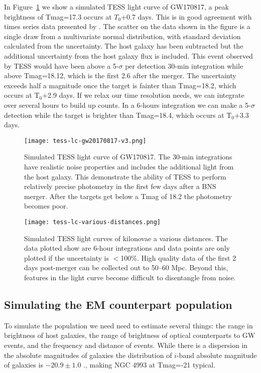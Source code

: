 \documentclass[modern]{aastex61}
\begin{document}
In Figure~\ref{fig:tesslc} we show a simulated TESS light curve of GW170817, a peak brightness of Tmag=17.3 occurs at $T_0$+0.7 days. This is in good agreement with times series data presented by \cite{Arcavi2017}. The scatter on the data shown in the figure is a single draw from a multivariate normal distribution, with standard deviation calculated from the uncertainty. The host galaxy has been subtracted but the additional uncertainty from the host galaxy flux is included. This event observed by TESS would have been above a 5-$\sigma$ per detection 30-min integration while above Tmag=18.12, which is the first 2.6 after the merger. The uncertainty exceeds half a magnitude once the target is fainter than Tmag=18.2, which occurs at T$_0$+2.9 days. If we relax our time resolution needs, we can integrate over several hours to build up counts. In a 6-hours integration we can make a 5-$\sigma$ detection while the target is brighter than Tmag=18.4, which occurs at T$_0$+3.3 days.

\begin{figure}
\centering
\texttt{[image: tess-lc-gw20170817-v3.png]}
\caption{Simulated TESS light curve of GW170817. The 30-min integrations have realistic noise properties and includes the additional light from the host galaxy. This demonstrate the ability of TESS to perform relatively precise photometry in the first few days after a BNS merger. After the targets get below a Tmag of 18.2 the photometry becomes poor.}
\label{fig:tesslc}
\end{figure}

\begin{figure}
\centering
\texttt{[image: tess-lc-various-distances.png]}
\caption{Simulated TESS light curves of kilonovae a various distances. The data plotted show are 6-hour integrations and data points are only plotted if the uncertainty is $<$100\%. High quality data of the first 2 days post-merger can be collected out to 50--60 Mpc. Beyond this, features in the light curve become difficult to disentangle from noise.}
\label{fig:tesslc-distances}
\end{figure}


\subsection{Simulating the EM counterpart population}
%
To simulate the population we need need to estimate several things: the range in brightness of host galaxies, the range of brightness of optical counterparts to GW events, and the frequency and distance of events. While there is a dispersion in the absolute magnitudes of galaxies the distribution of $i$-band absolute magnitude of galaxies is $-20.9\pm1.0$ \citep{Blanton2003}., making NGC 4993 at Tmag=-21 typical.
\end{document}
